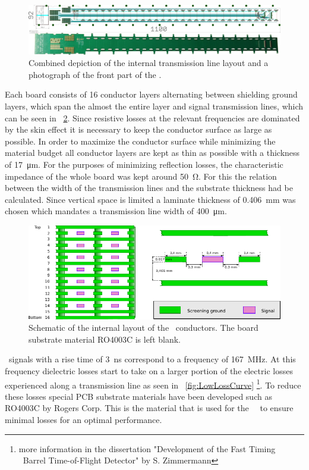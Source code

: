 \documentclass[../BTOF_summary.tex]{subfiles}
\begin{document}
\begin{figure}[htbp]
	\centering
	\includegraphics*[width=.9\textwidth]{fig/Railboard3_imageCombined.png}
	\caption{Combined depiction of the internal transmission line layout and a photograph of the front part of the \railboard .}
	\label{fig:Railboard}
\end{figure}

Each board consists of 16 conductor layers alternating between shielding ground layers, which span the almost the entire layer and signal transmission lines, which can be seen in \fig ~\ref{fig:Railboard3_schematic}.
Since resistive losses at the relevant frequencies are dominated by the skin effect it is necessary to keep the conductor surface as large as possible.
In order to maximize the conductor surface while minimizing the material budget all conductor layers are kept as thin as possible with a thickness of \SI{17}{\micro \meter}.
For the purposes of minimizing reflection losses, the characteristic impedance of the whole board was kept around \SI{50}{\ohm}.
For this the relation between the width of the transmission lines and the substrate thickness had be calculated.
Since vertical space is limited a laminate thickness of \SI{0.406}{mm} was chosen which mandates a transmission line width of \SI{400}{\micro m}.

\begin{figure}[htbp]
	\centering
	\includegraphics[width=.9\textwidth]{fig/Railboard3_schematic.pdf}
	\caption{Schematic of the internal layout of the \railboard\ conductors. The board substrate material RO4003C is left blank.}
	\label{fig:Railboard3_schematic}
\end{figure}

\sipm\ signals with a rise time of \SI{3}{ns} correspond to a frequency of \SI{167}{MHz}.
At this frequency dielectric losses start to take on a larger portion of the electric losses experienced along a transmission line as seen in \fig~\ref{fig:LowLossCurve} \footnote{more information in the dissertation "Development of the Fast Timing \panda\ Barrel Time-of-Flight Detector" by S. Zimmermann}.
To reduce these losses special PCB substrate materials have been developed such as RO4003C by Rogers Corp.
This is the material that is used for the \btof\ \railboard\ to ensure minimal losses for an optimal performance.
\end{document}
